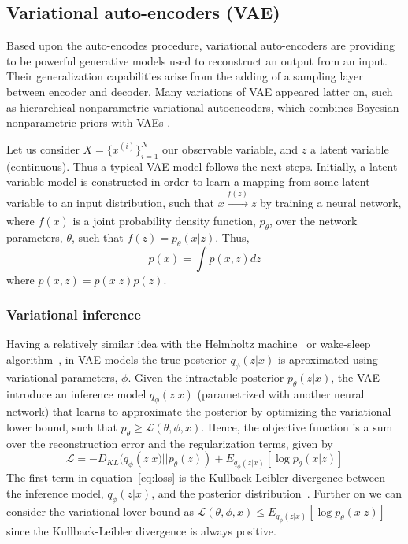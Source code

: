 \documentclass[sigconf,authorversion=true]{aamas}  %
\begin{document}
\subsection{Variational auto-encoders (VAE)}
Based upon the auto-encodes procedure, variational auto-encoders \cite{Kingma2013} are providing to be powerful generative models used to reconstruct an output from an input. Their generalization capabilities arise from the adding of a sampling layer between encoder and decoder. Many variations of VAE appeared latter on, such as  hierarchical nonparametric variational autoencoders, which combines Bayesian nonparametric priors with VAEs \cite{corr/Goyal17}.

Let us consider $X=\{x^{(i)}\}_{i=1}^N$ our observable variable, and $z$ a latent variable (continuous). Thus a typical VAE model follows the next steps. Initially, a latent variable model is constructed in order to learn a mapping from some latent variable to an input distribution, such that $x \xrightarrow[]{f(z)}z$   by training a neural network, where $f(x)$ is a  joint probability density function, $p_{\theta}$, over the network parameters, $\theta$, such that $f(z) =p_{\theta}(x|z)$. Thus,
\begin{equation}
p(x)=\int p(x,z) dz
\end{equation}
where $p(x,z)=p(x|z)p(z)$.

\subsubsection{Variational inference}

Having a relatively similar idea with the Helmholtz machine~\cite{helmholtzDayan95} or wake-sleep algorithm~\cite{wakesleepHinton1995}, in VAE models \cite{Kingma2013,pmlr-v32-rezende14} the true posterior $q_{\phi}(z|x)$ is aproximated using variational parameters, $\phi$. Given the intractable posterior $p_{\theta}(z|x)$, the VAE introduce an inference model $q_{\phi}(z|x)$ (parametrized with another neural network) that learns to approximate the posterior by optimizing the variational lower bound, such that $p_{\theta}\ge \mathcal{L}(\theta,\phi,x)$. Hence, the objective function is a sum over the reconstruction error and the regularization terms, given by
\begin{equation}\label{eq:loss}
\mathcal{L}=-D_{KL} (q_{\phi}(z|x)||p_{\theta}(z))+E_{q_{\phi}(z|x)}[\log p_\theta(x|z)]
\end{equation}
The first term in equation~\ref{eq:loss} is the Kullback-Leibler divergence between the inference model, $q_{\phi}(z|x)$, and the posterior distribution~\cite{Kullback59}. Further on we can consider the variational lover bound as $\mathcal{L}(\theta,\phi,x) \leq E_{q_{\phi}(z|x)}[\log p_\theta(x|z)]$ since the Kullback-Leibler divergence is always positive.
\end{document}

